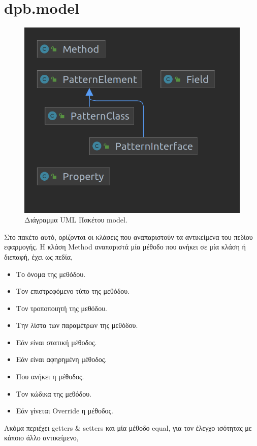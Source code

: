 \section{dpb.model}
\label{sec:dpb.model}
\begin{figure}[H]
    \centering
    \includegraphics[width=1.0\textwidth]{Figures/model.png}
    \caption{Διάγραμμα UML Πακέτου model.}
    \label{fig:modelUML}
\end{figure}
Στο πακέτο αυτό, ορίζονται οι κλάσεις που αναπαριστούν τα αντικείμενα του πεδίου εφαρμογής.
\newline
Η κλάση Method αναπαριστά μία μέθοδο που ανήκει σε μία κλάση ή διεπαφή, έχει ως πεδία,
\begin{itemize}
    \item Το όνομα της μεθόδου.
    \item Τον επιστρεφόμενο τύπο της μεθόδου.
    \item Τον τροποποιητή της μεθόδου.
    \item Την λίστα των παραμέτρων της μεθόδου.
    \item Εάν είναι στατική μέθοδος.
    \item Εάν είναι αφηρημένη μέθοδος.
    \item Που ανήκει η μέθοδος.
    \item Τον κώδικα της μεθόδου.
    \item Εάν γίνεται Override η μέθοδος.
\end{itemize}
Ακόμα περιέχει getters \& setters και μία μέθοδο equal, για τον έλεγχο ισότητας με κάποιο άλλο αντικείμενο, 
